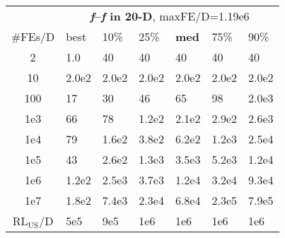 \begin{tabular}{c|llllll}
 & \multicolumn{6}{|c}{\textbf{\textit{f}\raisebox{-0.35ex}{1}--\textit{f}\raisebox{-0.35ex}{24} in 20-D}, maxFE/D=1.19e6}\\
\#FEs/D & best & 10\% & 25\% & \textbf{med} & 75\% & 90\%\\
2 & \hspace*{1ex}1.0 & 40 & 40 & 40 & 40 & 40\\
10 & 2.0e2 & 2.0e2 & 2.0e2 & 2.0e2 & 2.0e2 & 2.0e2\\
100 & 17 & 30 & 46 & 65 & 98 & 2.0e3\\
1e3 & 66 & 78 & 1.2e2 & 2.1e2 & 2.9e2 & 2.6e3\\
1e4 & 79 & 1.6e2 & 3.8e2 & 6.2e2 & 1.2e3 & 2.5e4\\
1e5 & 43 & 2.6e2 & 1.3e3 & 3.5e3 & 5.2e3 & 1.2e4\\
1e6 & 1.2e2 & 2.5e3 & 3.7e3 & 1.2e4 & 3.2e4 & 9.3e4\\
1e7 & 1.8e2 & 7.4e3 & 2.3e4 & 6.8e4 & 2.3e5 & 7.9e5\\
$\text{RL}_{\text{US}}$/D & 5e5 & 9e5 & 1e6 & 1e6 & 1e6 & 1e6
\end{tabular}
